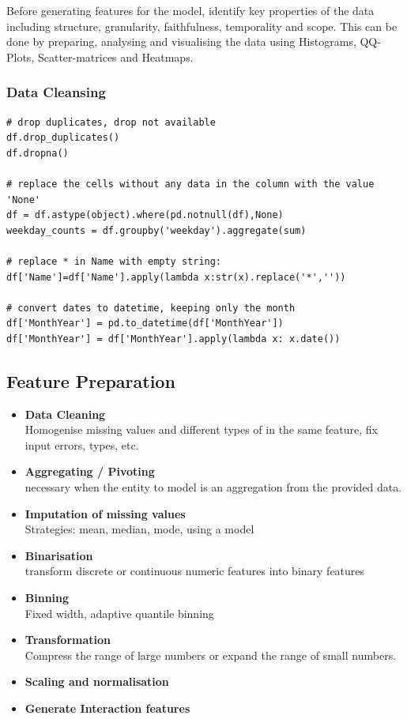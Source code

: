 \documentclass[11pt]{article}
\theoremstyle{definition}
\begin{document}
Before generating features for the model, identify key properties of the data including structure, granularity, faithfulness, temporality and scope. This can be done by preparing, analysing and visualising the data using Histograms, QQ-Plots, Scatter-matrices and Heatmaps.

\subsubsection{Data Cleansing}
\begin{verbatim}
# drop duplicates, drop not available
df.drop_duplicates()
df.dropna()

# replace the cells without any data in the column with the value 'None'
df = df.astype(object).where(pd.notnull(df),None)
weekday_counts = df.groupby('weekday').aggregate(sum)

# replace * in Name with empty string:
df['Name']=df['Name'].apply(lambda x:str(x).replace('*',''))

# convert dates to datetime, keeping only the month
df['MonthYear'] = pd.to_datetime(df['MonthYear'])
df['MonthYear'] = df['MonthYear'].apply(lambda x: x.date())
\end{verbatim}

\subsection{Feature Preparation}
\begin{itemize}
	\item \textbf{Data Cleaning}\\
	Homogenise missing values and different types of in the same feature, fix input errors, types, etc.
	\item \textbf{Aggregating / Pivoting}\\
	necessary when the entity to model is an aggregation from the provided data.
	\item \textbf{Imputation of missing values}\\
	Strategies: mean, median, mode, using a model
	\item \textbf{Binarisation}\\
	transform discrete or continuous numeric features into binary features
	\item  \textbf{Binning}\\
	Fixed width, adaptive quantile binning
	\item \textbf{Transformation}\\
	Compress the range of large numbers or expand the range of small numbers.
	\item \textbf{Scaling and normalisation}
	\item \textbf{Generate Interaction features}
\end{itemize}
\end{document}
